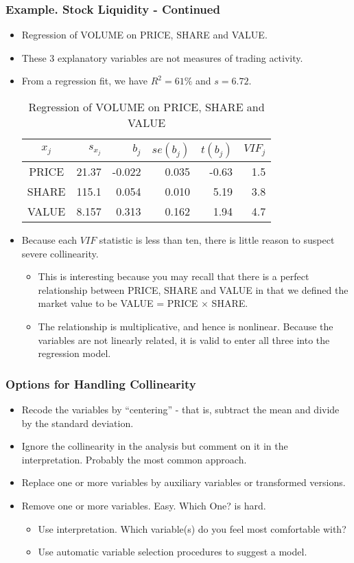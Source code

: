 \begin{frame}[shrink=2]
 \frametitle{Example. Stock Liquidity - Continued}
 \begin{itemize}
   \item Regression of VOLUME on PRICE,
SHARE and VALUE.
\item These 3 explanatory
variables are not measures of trading activity.
\item From a regression
fit, we have $R^{2}=61\%$ and $s=6.72$.
\begin{table}[h]
 \caption{Regression of VOLUME on PRICE, SHARE and
VALUE}

\begin{tabular}{crrrrr}
\hline
$x_j$ & $s_{x_j}$ & $b_j$ & $se(b_j)$ & $t(b_j)$ & $VIF_j$ \\
\hline PRICE& 21.37 & -0.022 & 0.035&
-0.63& 1.5 \\
SHARE & 115.1 & 0.054 & 0.010 &
5.19 & 3.8 \\
VALUE & 8.157 & 0.313 & 0.162 & 1.94 & 4.7
\\ \hline
\end{tabular}
\end{table}

\item Because each $VIF$ statistic is
less than ten, there is little reason to suspect severe
collinearity.
 \begin{itemize}
   \item This is interesting because you may recall that there
is a perfect relationship between PRICE, SHARE and VALUE in that we
defined the market value to be VALUE = PRICE $\times $ SHARE.
\item The relationship is multiplicative, and hence is nonlinear.
Because the variables are not linearly related, it is valid to enter
all three into the regression model.
    \end{itemize}    \end{itemize}
\end{frame}

\begin{frame}%
 \frametitle{Options for Handling Collinearity}
 \begin{itemize}
   \item Recode the variables by ``centering'' - that is, subtract
   the mean and divide by the standard deviation.
 \item Ignore the collinearity in the analysis but comment on it in the
interpretation. Probably the most common approach.
 \item Replace one or more variables by auxiliary variables or
 transformed versions.
 \item Remove one or more variables.  Easy.  Which One? is
hard.
 \begin{itemize}
   \item  Use interpretation.  Which variable(s) do you feel most comfortable with?
     \item Use automatic variable selection procedures to suggest a model.
    \end{itemize}

    \end{itemize}
\end{frame}

